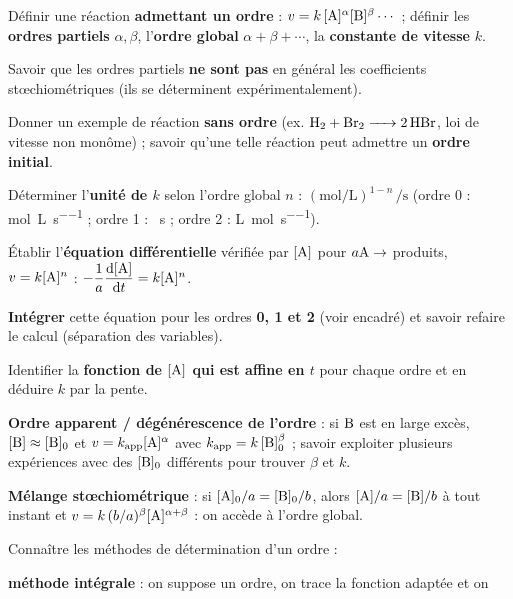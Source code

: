 \documentclass[11pt,a4paper]{article}
\newcommand{\conc}[1]{[\ce{#1}]}
\begin{document}
\begin{savoir}
  \item Définir une réaction \textbf{admettant un ordre} :
        $v = k\,\conc{A}^{\alpha}\conc{B}^{\beta}\cdots$ ; définir les \textbf{ordres partiels}
        $\alpha,\beta$, l'\textbf{ordre global} $\alpha+\beta+\cdots$, la \textbf{constante de vitesse} $k$.
  \item Savoir que les ordres partiels \textbf{ne sont pas} en général les coefficients
        stœchiométriques (ils se déterminent expérimentalement).
  \item Donner un exemple de réaction \textbf{sans ordre}
        (ex. $\ce{H2 + Br2 -> 2 HBr}$, loi de vitesse non monôme) ; savoir qu'une telle réaction peut
        admettre un \textbf{ordre initial}.
  \item Déterminer l'\textbf{unité de $k$} selon l'ordre global $n$ :
        $(\si{\mol\per\liter})^{1-n}\,\si{\per\second}$
        (ordre 0 : \si{\mol\per\liter\per\second} ; ordre 1 : \si{\per\second} ;
        ordre 2 : \si{\liter\per\mol\per\second}).
  \item Établir l'\textbf{équation différentielle} vérifiée par $\conc{A}$ pour $a\ce{A}\to$ produits,
        $v=k\conc{A}^n$ : $-\dfrac{1}{a}\dfrac{\mathrm{d}\conc{A}}{\mathrm{d}t}=k\conc{A}^n$.
  \item \textbf{Intégrer} cette équation pour les ordres \textbf{0, 1 et 2} (voir encadré) et
        savoir refaire le calcul (séparation des variables).
  \item Identifier la \textbf{fonction de $\conc{A}$ qui est affine en $t$} pour chaque ordre et en
        déduire $k$ par la pente.
  \item \textbf{Ordre apparent / dégénérescence de l'ordre} : si $\ce{B}$ est en large excès,
        $\conc{B}\approx\conc{B}_0$ et $v = k_{\mathrm{app}}\conc{A}^{\alpha}$ avec
        $k_{\mathrm{app}} = k\,\conc{B}_0^{\beta}$ ; savoir exploiter plusieurs expériences
        avec des $\conc{B}_0$ différents pour trouver $\beta$ et $k$.
  \item \textbf{Mélange stœchiométrique} : si $\conc{A}_0/a=\conc{B}_0/b$, alors
        $\conc{A}/a=\conc{B}/b$ à tout instant et $v = k\,(b/a)^{\beta}\conc{A}^{\alpha+\beta}$ :
        on accède à l'ordre global.
  \item Connaître les méthodes de détermination d'un ordre :
    \begin{savoir}
      \item \textbf{méthode intégrale} : on suppose un ordre, on trace la fonction adaptée et on

\end{savoir}
\end{savoir}
\end{document}
